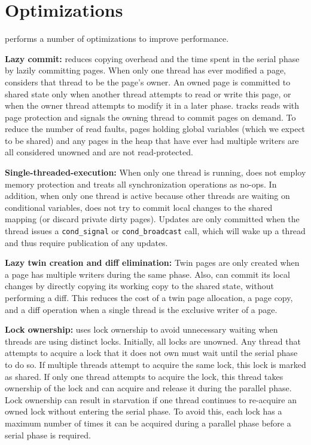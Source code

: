 \section{Optimizations}
\label{sec:dthreads-optimization}

\dthreads{} performs a number of optimizations to improve performance.

\textbf{Lazy commit:} \dthreads{} reduces copying overhead and the time spent in the serial phase by lazily committing pages. When only one thread has ever modified a page, \dthreads{} considers that thread to be the page’s owner. An owned page is committed to shared state only when another thread attempts to read or write this page, or when the owner thread attempts to modify it in a later phase. \dthreads{} tracks reads with page protection and signals the owning thread to commit pages on demand. To reduce the number of read faults, pages holding global variables (which we expect to be shared) and any pages in the heap that have ever had multiple writers are all considered unowned and are not read-protected.

\textbf{Single-threaded-execution: }
When only one thread is running, \dthreads{} does not employ memory protection and treats all synchronization operations as no-ops. In addition, when only one thread is active because other threads are waiting on conditional variables, 
\dthreads{} does not try to commit local changes to the shared mapping (or discard private dirty pages). Updates are only committed when the thread issues a \texttt{cond\_signal} or \texttt{cond\_broadcast} call, which will wake up a thread and thus require publication of any updates.

\textbf{Lazy twin creation and diff elimination: }
Twin pages are only created when a page has multiple writers during the same phase. Also, \dthreads{} can commit its local changes by directly copying its working copy to the shared state, without performing a diff. This reduces the cost of a twin page allocation, a page copy, and a diff operation when a single thread is the exclusive writer of a page.

\textbf{Lock ownership:} \dthreads{} uses lock ownership to avoid unnecessary waiting when threads are using distinct locks. Initially, all locks are unowned. Any thread that attempts to acquire a lock that it does not own must wait until the serial phase to do so. If multiple threads attempt to acquire the same lock, this lock is marked as shared. If only one thread attempts to acquire the lock, this thread takes ownership of the lock and can acquire and release
it during the parallel phase. Lock ownership can result in starvation if one thread continues to re-acquire an owned lock without entering the serial phase. To avoid this, each lock has a maximum number of times it can be acquired during a parallel phase before a serial phase is required.

